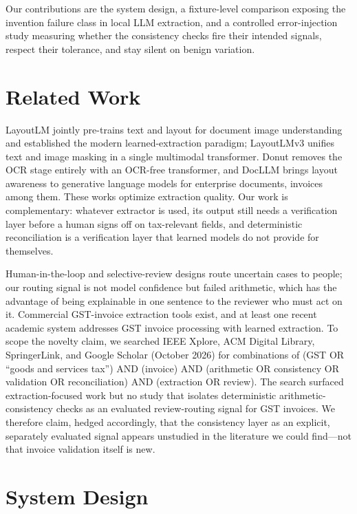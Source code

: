 \documentclass[conference]{IEEEtran}
\begin{document}
Our contributions are the system design, a fixture-level comparison exposing the invention failure class in local LLM extraction, and a controlled error-injection study measuring whether the consistency checks fire their intended signals, respect their tolerance, and stay silent on benign variation.

\section{Related Work}
LayoutLM \cite{layoutlm} jointly pre-trains text and layout for document image understanding and established the modern learned-extraction paradigm; LayoutLMv3 \cite{layoutlmv3} unifies text and image masking in a single multimodal transformer. Donut \cite{donut} removes the OCR stage entirely with an OCR-free transformer, and DocLLM \cite{docllm} brings layout awareness to generative language models for enterprise documents, invoices among them. These works optimize extraction quality. Our work is complementary: whatever extractor is used, its output still needs a verification layer before a human signs off on tax-relevant fields, and deterministic reconciliation is a verification layer that learned models do not provide for themselves.

Human-in-the-loop and selective-review designs route uncertain cases to people; our routing signal is not model confidence but failed arithmetic, which has the advantage of being explainable in one sentence to the reviewer who must act on it. Commercial GST-invoice extraction tools exist, and at least one recent academic system addresses GST invoice processing with learned extraction. To scope the novelty claim, we searched IEEE Xplore, ACM Digital Library, SpringerLink, and Google Scholar (October 2026) for combinations of (GST OR ``goods and services tax'') AND (invoice) AND (arithmetic OR consistency OR validation OR reconciliation) AND (extraction OR review). The search surfaced extraction-focused work but no study that isolates deterministic arithmetic-consistency checks as an evaluated review-routing signal for GST invoices. We therefore claim, hedged accordingly, that the consistency layer as an explicit, separately evaluated signal appears unstudied in the literature we could find---not that invoice validation itself is new. %

\section{System Design}
\end{document}

